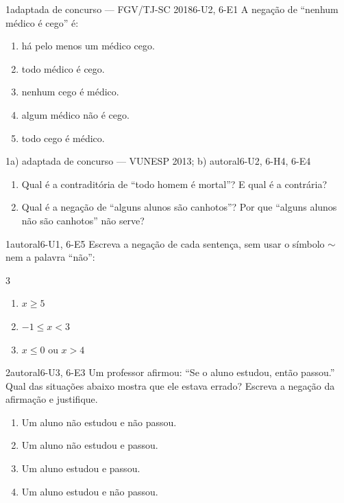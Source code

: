 \begin{questao}{1}{adaptada de concurso — FGV/TJ-SC 2018}{6-U2, 6-E1}\label{u6:q2}
A negação de \enquote{nenhum médico é cego} é:
\begin{enumerate}[label=(\alph*)]
  \item há pelo menos um médico cego.
  \item todo médico é cego.
  \item nenhum cego é médico.
  \item algum médico não é cego.
  \item todo cego é médico.
\end{enumerate}
\end{questao}

\begin{questao}{1}{a) adaptada de concurso — VUNESP 2013; b) autoral}{6-U2, 6-H4, 6-E4}\label{u6:q3}
\begin{enumerate}[label=\alph*)]
  \item Qual é a contraditória de \enquote{todo homem é mortal}? E qual é a contrária?
  \item Qual é a negação de \enquote{alguns alunos são canhotos}? Por que \enquote{alguns alunos não são canhotos} não serve?
\end{enumerate}
\end{questao}

\begin{questao}{1}{autoral}{6-U1, 6-E5}\label{u6:q4}
Escreva a negação de cada sentença, sem usar o símbolo ${{\sim}}$ nem a palavra \enquote{não}:
\begin{multicols}{3}
\begin{enumerate}[label=\alph*)]
  \item $x\ge5$
  \item $-1\le x<3$
  \item $x\le0$ ou $x>4$
\end{enumerate}
\end{multicols}
\end{questao}

\begin{questao}{2}{autoral}{6-U3, 6-E3}\label{u6:q5}
Um professor afirmou: \enquote{Se o aluno estudou, então passou.} Qual das situações abaixo mostra que ele estava errado? Escreva a negação da afirmação e justifique.
\begin{enumerate}[label=(\alph*)]
  \item Um aluno não estudou e não passou.
  \item Um aluno não estudou e passou.
  \item Um aluno estudou e passou.
  \item Um aluno estudou e não passou.
\end{enumerate}
\end{questao}

